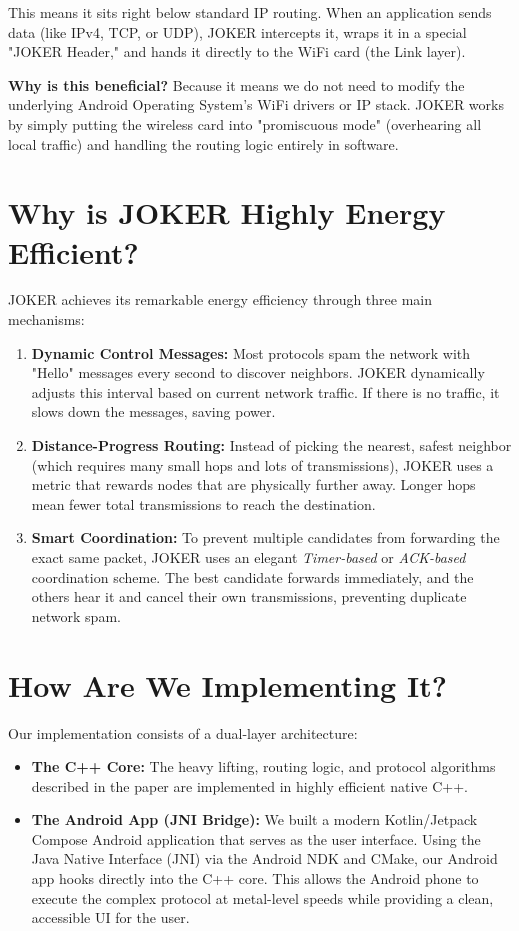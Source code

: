 \documentclass[12pt]{article}
\begin{document}
This means it sits right below standard IP routing. When an application sends data (like IPv4, TCP, or UDP), JOKER intercepts it, wraps it in a special "JOKER Header," and hands it directly to the WiFi card (the Link layer). 

\textbf{Why is this beneficial?} Because it means we do not need to modify the underlying Android Operating System's WiFi drivers or IP stack. JOKER works by simply putting the wireless card into "promiscuous mode" (overhearing all local traffic) and handling the routing logic entirely in software.

\section{Why is JOKER Highly Energy Efficient?}
JOKER achieves its remarkable energy efficiency through three main mechanisms:
\begin{enumerate}
    \item \textbf{Dynamic Control Messages:} Most protocols spam the network with "Hello" messages every second to discover neighbors. JOKER dynamically adjusts this interval based on current network traffic. If there is no traffic, it slows down the messages, saving power.
    \item \textbf{Distance-Progress Routing:} Instead of picking the nearest, safest neighbor (which requires many small hops and lots of transmissions), JOKER uses a metric that rewards nodes that are physically further away. Longer hops mean fewer total transmissions to reach the destination.
    \item \textbf{Smart Coordination:} To prevent multiple candidates from forwarding the exact same packet, JOKER uses an elegant \textit{Timer-based} or \textit{ACK-based} coordination scheme. The best candidate forwards immediately, and the others hear it and cancel their own transmissions, preventing duplicate network spam.
\end{enumerate}

\section{How Are We Implementing It?}
Our implementation consists of a dual-layer architecture:
\begin{itemize}
    \item \textbf{The C++ Core:} The heavy lifting, routing logic, and protocol algorithms described in the paper are implemented in highly efficient native C++.
    \item \textbf{The Android App (JNI Bridge):} We built a modern Kotlin/Jetpack Compose Android application that serves as the user interface. Using the Java Native Interface (JNI) via the Android NDK and CMake, our Android app hooks directly into the C++ core. This allows the Android phone to execute the complex protocol at metal-level speeds while providing a clean, accessible UI for the user.
\end{itemize}
\end{document}
